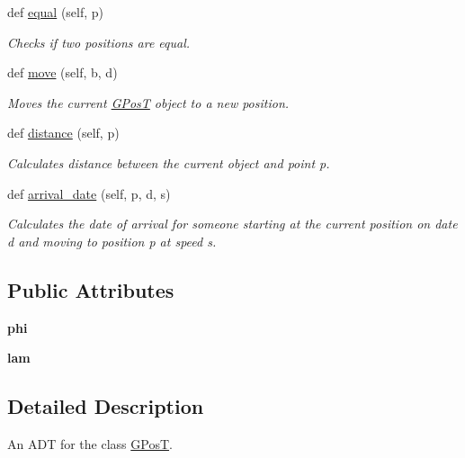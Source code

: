 \begin{DoxyCompactItemize}
def \hyperlink{classpos__adt_1_1_g_pos_t_a07040d59fe466b24738749cf40c6a965}{equal} (self, p)
\begin{DoxyCompactList}\small\item\em Checks if two positions are equal. \end{DoxyCompactList}\item 
def \hyperlink{classpos__adt_1_1_g_pos_t_ac073f4ce8d6a10a6325c5f667ea0c2a3}{move} (self, b, d)
\begin{DoxyCompactList}\small\item\em Moves the current \hyperlink{classpos__adt_1_1_g_pos_t}{G\+PosT} object to a new position. \end{DoxyCompactList}\item 
def \hyperlink{classpos__adt_1_1_g_pos_t_ad09472793d0194e188f76679af84e734}{distance} (self, p)
\begin{DoxyCompactList}\small\item\em Calculates distance between the current object and point p. \end{DoxyCompactList}\item 
def \hyperlink{classpos__adt_1_1_g_pos_t_a5a92fc2c750bc5fda289e7fbfb98bdf6}{arrival\+\_\+date} (self, p, d, s)
\begin{DoxyCompactList}\small\item\em Calculates the date of arrival for someone starting at the current position on date d and moving to position p at speed s. \end{DoxyCompactList}\end{DoxyCompactItemize}
\subsection*{Public Attributes}
\begin{DoxyCompactItemize}
\item 
\mbox{\label{classpos__adt_1_1_g_pos_t_a28e8638525d9c5eabe69ecc6a23a3fb3}} 
{\bfseries phi}
\item 
\mbox{\label{classpos__adt_1_1_g_pos_t_a4ea18baeb6cb8df8c565edc97e477c53}} 
{\bfseries lam}
\end{DoxyCompactItemize}


\subsection{Detailed Description}
An A\+DT for the class \hyperlink{classpos__adt_1_1_g_pos_t}{G\+PosT}. 

